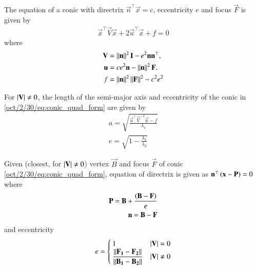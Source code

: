 \begin{lemma}
The equation of  a conic with directrix $\vec{n}^{\top}\vec{x} = c$, eccentricity $e$ and focus $\vec{F}$ is given by 
\begin{align}
    \label{oct/2/30/eq:conic_quad_form}
    \vec{x}^{\top}\vec{V}\vec{x}+2\vec{u}^{\top}\vec{x}+f=0
\end{align}
where     
\begin{align}
    \label{oct/2/30/eq:conic_quad_form_v}
    \mathbf{V} &=\left\lVert\mathbf{n}\right\rVert^2\mathbf{I}-e^2\mathbf{n}\mathbf{n}^{\top}, \\
    \label{oct/2/30/eq:conic_quad_form_u}
    \mathbf{u} &= ce^2\mathbf{n}-\left\lVert\mathbf{n}\right\rVert^2\mathbf{F}, \\
    \label{oct/2/30/eq:conic_quad_form_f}
    f &= \left\lVert\mathbf{n}\right\rVert^2\left\lVert\mathbf{F}\right\rVert^2-c^2e^2
\end{align}
\end{lemma}
\begin{lemma}
    For $\left\vert\mathbf{V}\right\vert \ne 0$, the length of the semi-major axis and eccentricity of the conic in \eqref{oct/2/30/eq:conic_quad_form} are given by 
    \begin{align} 
        \label{oct/2/30/eq:ab} a = \sqrt{\frac{\vec{u}^{\top}\vec{V}^{-1}\vec{u} -f}{\lambda_1}}\\
        \label{oct/2/30/eq:eccentricity} e = \sqrt{1-\frac{\lambda_1}{\lambda_2}}
    \end{align}
\end{lemma}
\begin{lemma}
Given (closest, for $\left\vert\mathbf{V}\right\vert \neq 0$) vertex $\vec{B}$ and focus $\vec{F}$ of conic \eqref{oct/2/30/eq:conic_quad_form}, equation of directrix is given as $\mathbf{n}^{\top}\left(\mathbf{x} - \mathbf{P}\right) = 0$ where
\begin{align}
    \mathbf{P} = \mathbf{B} + \frac{\left(\mathbf{B}-\mathbf{F}\right)}{e}\\
    \mathbf{n} = \mathbf{B}-\mathbf{F}
\end{align}
and eccentricity
\begin{align}
    \label{oct/2/30/eq:eccentricity} e = 
    \begin{cases}
    1 & \left\vert\mathbf{V}\right\vert = 0\\
    \dfrac{\left\lVert\mathbf{F_1}-\mathbf{F_2}\right\rVert}{\left\lVert\mathbf{B_1}-\mathbf{B_2}\right\rVert} & \left\vert\mathbf{V}\right\vert \neq 0
    \end{cases}
\end{align}
\end{lemma}
